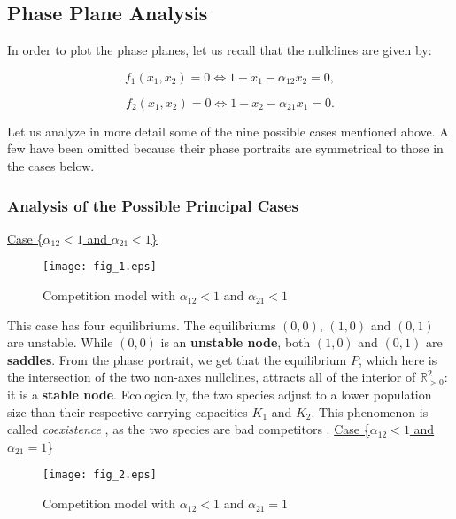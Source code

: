 \documentclass[11pt,a4paper]{scrartcl}
\theoremstyle{definition}
\begin{document}
\subsection{Phase Plane Analysis}

In order to plot the phase planes, let us recall that the nullclines are given by:

\begin{equation}\label{eq16}
	f_1(x_1, x_2)=0 \Leftrightarrow 1-x_1-\alpha_{12}x_2=0,
\end{equation}

\begin{equation} \label{eq17}
	f_2(x_1, x_2)=0 \Leftrightarrow 1-x_2-\alpha_{21}x_1=0.
\end{equation}

Let us analyze in more detail some of the nine possible cases mentioned above. A few have been omitted because their phase portraits are symmetrical to those in the cases below.

\subsubsection{Analysis of the Possible Principal Cases}

\underline{Case \Big\{$\alpha_{12} < 1$ and $\alpha_{21} < 1$\Big\}}\newline

\begin{figure}[!ht]
\centering
\texttt{[image: fig\_1.eps]}
\caption{Competition model with $\alpha_{12} < 1$ and $\alpha_{21} < 1$}
\label{figC1}
\end{figure} 

This case has four equilibriums. The equilibriums $(0, 0)$, $(1, 0)$ and $(0, 1)$ are unstable. While $(0, 0)$ is an \textbf{unstable node}, both $(1, 0)$ and $(0, 1)$ are \textbf{saddles}. From the phase portrait, we get that the equilibrium $P$, which here is the intersection of the two non-axes nullclines, attracts all of the interior of $\mathbb{R}_{>0}^2$: it is a \textbf{stable node}. Ecologically, the two species adjust to a lower population size than their respective carrying capacities $K_1$ and $K_2$. This phenomenon is called \textit{coexistence} , as the two species are bad competitors \cite{Murray}.
\FloatBarrier
\vspace{1em}
\underline {Case \Big\{$\alpha_{12} < 1$ and $\alpha_{21} = 1$\Big\}}\newline

\begin{figure}[!ht]
\centering
\texttt{[image: fig\_2.eps]}
\caption{Competition model with $\alpha_{12} < 1$ and $\alpha_{21} = 1$}
\label{figC2}
\end{figure} 
\end{document}
